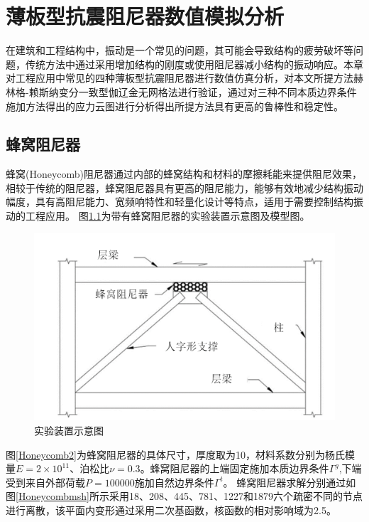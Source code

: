\chapter{薄板型抗震阻尼器数值模拟分析}
在建筑和工程结构中，振动是一个常见的问题，其可能会导致结构的疲劳破坏等问题，传统方法中通过采用增加结构的刚度或使用阻尼器减小结构的振动响应。本章对工程应用中常见的四种薄板型抗震阻尼器进行数值仿真分析，对本文所提方法赫林格-赖斯纳变分一致型伽辽金无网格法进行验证，通过对三种不同本质边界条件施加方法得出的应力云图进行分析得出所提方法具有更高的鲁棒性和稳定性。
\section{蜂窝阻尼器}
蜂窝(Honeycomb)阻尼器通过内部的蜂窝结构和材料的摩擦耗能来提供阻尼效果，相较于传统的阻尼器，蜂窝阻尼器具有更高的阻尼能力，能够有效地减少结构振动幅度，具有高阻尼能力、宽频响特性和轻量化设计等特点，适用于需要控制结构振动的工程应用。
图\ref{Honeycomb1}为带有蜂窝阻尼器的实验装置示意图及模型图。
\begin{figure}[H]
    \centering
    \includegraphics[scale=0.6]{figure/DAMPER/Honeycomb/1.png}
    \caption{实验装置示意图\cite{javanmardi2020}}\label{Honeycomb1}
\end{figure}
图\ref{Honeycomb2}为蜂窝阻尼器的具体尺寸，厚度取为10，材料系数分别为杨氏模量$E=2\times 10^{11}$、泊松比$\nu=0.3$。蜂窝阻尼器的上端固定施加本质边界条件$\Gamma^g$,下端受到来自外部荷载$P=100000$施加自然边界条件$\Gamma^t$。
蜂窝阻尼器求解分别通过如图\ref{Honeycombmsh}所示采用18、208、445、781、1227和1879六个疏密不同的节点进行离散，该平面内变形通过采用二次基函数，核函数的相对影响域为2.5。
